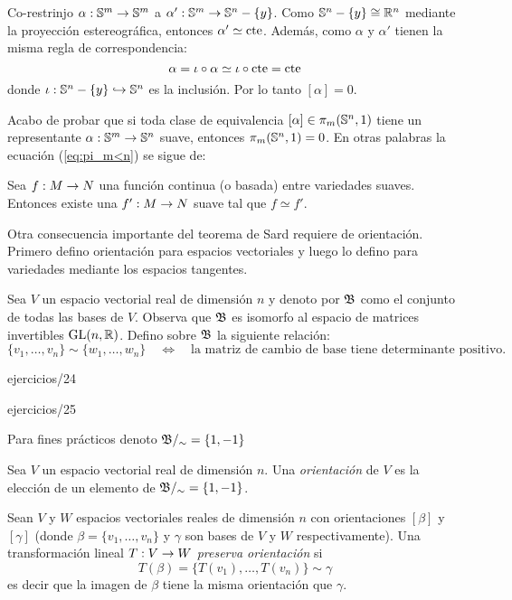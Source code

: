 \documentclass[../../topologia_algebraica]{subfiles}
\begin{document}
Co-restrinjo $\alpha:\mathbb{S}^m\rightarrow\mathbb{S}^m$ a $\alpha':\mathbb{S}^m\rightarrow\mathbb{S}^n-\{y\}$. Como $\mathbb{S}^n-\{y\}\cong\mathbb{R}^n$
mediante la proyecci\'on estereogr\'afica, entonces $\alpha'\simeq \text{cte}$. Adem\'as, como
$\alpha$ y $\alpha'$ tienen la misma regla de correspondencia: 
\[
  \alpha= \iota\circ\alpha \simeq \iota\circ\text{cte} =\text{cte}
\]
donde $\iota:\mathbb{S}^n-\{y\}\hookrightarrow\mathbb{S}^n$ es la inclusi\'on. Por lo tanto $[\alpha]=0$.

Acabo de probar que si toda clase de equivalencia $[\alpha]\in\pi_m(\mathbb{S}^n,1)$ tiene un representante
$\alpha:\mathbb{S}^m\rightarrow\mathbb{S}^n$ suave, entonces $\pi_m(\mathbb{S}^n,1)=0$. En otras palabras la ecuaci\'on
(\ref{eq:pi_m<n}) se sigue de:

\begin{thm}\label{thm:deformacion_suave}
  Sea $f:M\rightarrow N$ una funci\'on continua (o basada) entre variedades suaves. Entonces existe una
  $f':M\rightarrow N$ suave tal que $f\simeq f'$.
\end{thm}

Otra consecuencia importante del teorema de Sard requiere de orientaci\'on. Primero defino
orientaci\'on para espacios vectoriales y luego lo defino para variedades mediante los
espacios tangentes.

Sea $V$ un espacio vectorial real de dimensi\'on $n$ y denoto por $\mathfrak{B}$ como el conjunto de
todas las bases de $V$. Observa que $\mathfrak{B}$ es isomorfo al espacio de matrices invertibles
$\text{GL}(n,\mathbb{R})$. Defino sobre $\mathfrak{B}$ la siguiente relaci\'on:
\[
  \{v_1,\ldots,v_n\}\sim\{w_1,\ldots,w_n\} \quad\iff\quad
  \text{la matriz de cambio de base tiene determinante positivo}.
\]

{ejercicios/24} %

{ejercicios/25} %

Para fines pr\'acticos denoto $\mathfrak{B}/_{\sim}=\{1,-1\}$

\begin{defin}
  Sea $V$ un espacio vectorial real de dimensi\'on $n$. Una \emph{orientaci\'on} de $V$ es la
  elecci\'on de un elemento de $\mathfrak{B}/_{\sim}=\{1,-1\}$.
\end{defin}

\begin{defin}
  Sean $V$ y $W$ espacios vectoriales reales de dimensi\'on $n$ con orientaciones $[\beta]$ y
  $[\gamma]$ (donde $\beta=\{v_1,\ldots,v_n\}$ y $\gamma$ son bases de $V$ y $W$ respectivamente).
  Una transformaci\'on lineal $T:V\rightarrow W$ \emph{preserva orientaci\'on} si
  \[
    T(\beta)=\{T(v_1),\ldots,T(v_n)\}\sim\gamma
  \]
  es decir que la imagen de $\beta$ tiene la misma orientaci\'on que $\gamma$.
\end{defin}
\end{document}
